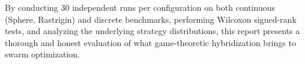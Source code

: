 \documentclass[12pt,a4paper]{article}
\begin{document}
By conducting 30 independent runs per configuration on both continuous (Sphere, Rastrigin) and discrete benchmarks, performing Wilcoxon signed-rank tests, and analyzing the underlying strategy distributions, this report presents a thorough and honest evaluation of what game-theoretic hybridization brings to swarm optimization.

\newpage



\newpage



\end{document}
